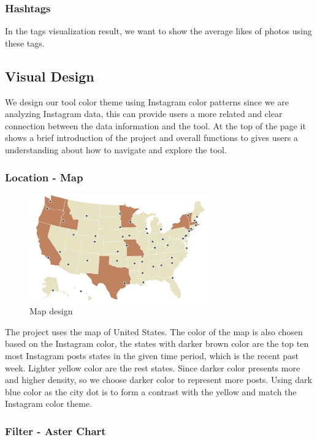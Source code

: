 \documentclass[conference]{acmsiggraph}
\begin{document}
\subsubsection{Hashtags}
In the tags visualization result, we want to show the average likes of photos using these tags.

\subsection{Visual Design}

We design our tool color theme using Instagram color patterns since we are analyzing Instagram data, this can provide users a more related and clear connection between the data information and the tool. At the top of the page it shows a brief introduction of the project and overall functions to gives users a understanding about how to navigate and explore the tool.

\subsubsection{Location - Map}

\begin{figure}[ht]
  \centering
\includegraphics[width=3in]{images/map}
  \caption{Map design}
  \label{like-filter}
\end{figure}
The project uses the map of United States. The color of the map is also chosen based on the Instagram color, the states with darker brown color are the top ten most Instagram posts states in the given time period, which is the recent past week. Lighter yellow color are the rest states. Since darker color presents more and higher density, so we choose darker color to represent more posts. Using dark blue color as the city dot is to form a contrast with the yellow and match the Instagram color theme.


\subsubsection{Filter - Aster Chart}
\end{document}
